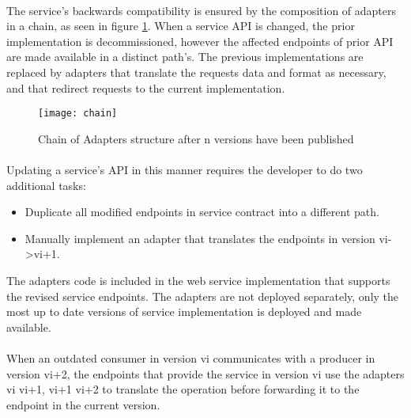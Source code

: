 \paragraph{}

The service's backwards compatibility is ensured by the composition of adapters in a chain, as seen in figure \ref{fig:chain}.
When a service API is changed, the prior implementation is decommissioned, however the affected endpoints of prior API are made available in a distinct path's.
The previous implementations are replaced by adapters that translate the requests data and format as necessary, and that redirect requests to the current implementation.

\begin{figure}[htbp]
    \centering
    \texttt{[image: chain]}
    \caption{Chain of Adapters structure
    after n versions have been published }
    \label{fig:chain}
\end{figure}

\paragraph{}

Updating a service's API in this manner requires the developer to do two additional tasks:
\begin{itemize}
    \item Duplicate all modified endpoints in service contract into a different path.
    \item Manually implement an adapter that translates the endpoints in version vi->vi+1.
\end{itemize}
The adapters code is included in the web service implementation that supports the revised service endpoints.
The adapters are not deployed separately, only the most up to date versions of service implementation is deployed and made available.

\paragraph{}

When an outdated consumer in version vi communicates with a producer in version vi+2, the endpoints that provide the service
in version vi use the adapters vi \textrightarrow vi+1, vi+1 \textrightarrow vi+2 to translate the operation before forwarding it to the endpoint in the current version.

\paragraph{}

